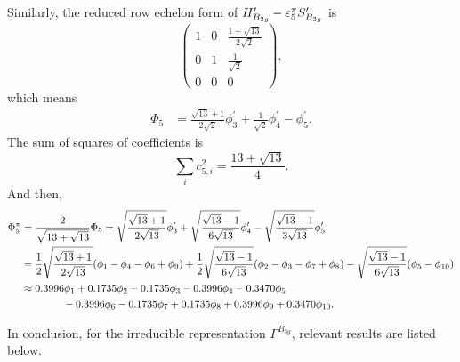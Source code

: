 		Similarly, the reduced row echelon form of $H^\prime_{B_{3g}}-\varepsilon^\pi_5 S^\prime_{B_{3g}}$ is
		\begin{equation*}
			\begin{pmatrix}
				1	& 0	&	\frac{1+\sqrt{13}}{2\sqrt{2}}	\\	0	&	1	&	\frac{1}{\sqrt{2}}	\\	0	&	0	&	0
			\end{pmatrix},
		\end{equation*}		
		which means
		\begin{align*}
			\Phi_5 &= \frac{\sqrt{13}+1}{2\sqrt{2}}\phi^\prime_3 + \frac{1}{\sqrt{2}} \phi^\prime_4 - \phi^\prime_5.
		\end{align*}
		The sum of squares of coefficients is
		\begin{equation*}
			\sum_{i} c^2_{5,i} = \frac{13+\sqrt{13}}{4}.
		\end{equation*}
		And then,
		\begin{align}
			\Phi^\pi_5 &= \frac{2}{\sqrt{13+\sqrt{13}}} \Phi_5 = \sqrt{\frac{\sqrt{13}+1}{2\sqrt{13}}} \phi^\prime_3 + \sqrt{\frac{\sqrt{13}-1}{6\sqrt{13}}} \phi^\prime_4	- \sqrt{\frac{\sqrt{13}-1}{3\sqrt{13}}} \phi^\prime_5\notag \\
			&= \frac{1}{2}\sqrt{\frac{\sqrt{13}+1}{2\sqrt{13}}}(\phi_1 - \phi_4 - \phi_6 + \phi_9) + \frac{1}{2}\sqrt{\frac{\sqrt{13}-1}{6\sqrt{13}}} (\phi_2 - \phi_3 - \phi_7 + \phi_8) \notag - \sqrt{\frac{\sqrt{13}-1}{6\sqrt{13}}} (\phi_5 -\phi_{10})  \\
			&\approx 0.3996 \phi_1 + 0.1735 \phi_2 - 0.1735 \phi_3 -0.3996 \phi_4 - 0.3470 \phi_5 \notag \\
			&\hspace*{4em} - 0.3996\phi_6 -0.1735 \phi_7 +0.1735 \phi_8 + 0.3996 \phi_9 + 0.3470 \phi_{10}.
		\end{align}

		In conclusion, for the irreducible representation $\Gamma^{B_{3g}}$, relevant results are listed below.
		
